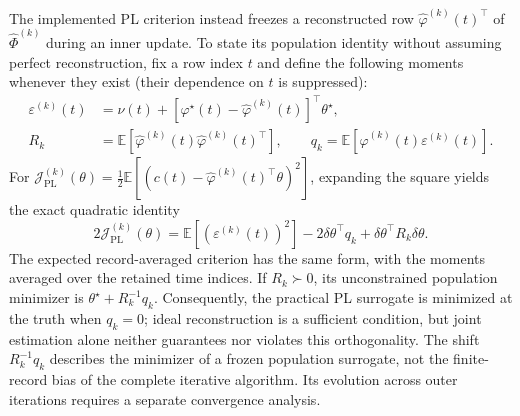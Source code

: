 The implemented PL criterion instead freezes a reconstructed row
$\hat\varphi^{(k)}(t)^\top$ of $\hat\Phi^{(k)}$ during an inner update.
To state its population identity without assuming perfect reconstruction,
fix a row index $t$ and define the following moments whenever they exist
(their dependence on $t$ is suppressed):
\begin{align}
\label{eq:bias_PL_reconstruction}
 \varepsilon^{(k)}(t)
 &=\nu(t)+[\varphi^\star(t)-\hat\varphi^{(k)}(t)]^\top\theta^\star,\\
 R_k&=\mathbb E[\hat\varphi^{(k)}(t)\hat\varphi^{(k)}(t)^\top],
 \qquad
 q_k=\mathbb E[\hat\varphi^{(k)}(t)\varepsilon^{(k)}(t)].\nonumber
\end{align}
For
$\mathcal J_{\mathrm{PL}}^{(k)}(\theta)
=\frac12\mathbb E[(c(t)-\hat\varphi^{(k)}(t)^\top\theta)^2]$,
expanding the square yields the exact quadratic identity
\begin{equation}
\label{eq:bias_population_PL_reconstructed}
 2\mathcal J_{\mathrm{PL}}^{(k)}(\theta)
 =\mathbb E[(\varepsilon^{(k)}(t))^2]
  -2\delta\theta^\top q_k+\delta\theta^\top R_k\delta\theta.
\end{equation}
The expected record-averaged criterion has the same form, with the
moments averaged over the retained time indices.
If $R_k\succ0$, its unconstrained population minimizer is
$\theta^\star+R_k^{-1}q_k$. Consequently, the practical PL surrogate
is minimized at the truth when $q_k=0$; ideal reconstruction is a
sufficient condition, but joint estimation alone neither guarantees
nor violates this orthogonality. The shift $R_k^{-1}q_k$ describes
the minimizer of a frozen population surrogate, not the finite-record
bias of the complete iterative algorithm. Its evolution across outer
iterations requires a separate convergence analysis.

